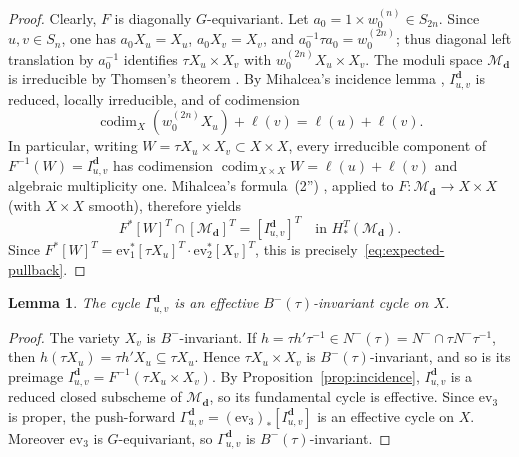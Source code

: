 \documentclass[12pt]{amsart}
\newtheorem{lemma}[theorem]{Lemma}
\theoremstyle{definition}
\theoremstyle{remark}
\begin{document}
\begin{proof}
Clearly, \(F\) is diagonally \(G\)-equivariant. Let
\(a_0=1\times w_0^{(n)}\in S_{2n}\). Since \(u,v\in S_n\), one has
\(a_0X_u=X_u\), \(a_0X_v=X_v\), and \(a_0^{-1}\tau a_0=w_0^{(2n)}\); thus
diagonal left translation by \(a_0^{-1}\) identifies
\(\tau X_u\times X_v\) with \(w_0^{(2n)}X_u\times X_v\). The moduli space \(\mathcal{M}_{\mathbf{d}}\)
is irreducible by Thomsen's theorem \cite[Theorem~1]{thomsen}. By 
Mihalcea's incidence lemma \cite[Lemma~6.3]{Mih}, 
\(I_{u,v}^{\mathbf{d}}\) is reduced, locally irreducible, and of
codimension
\[
\operatorname{codim}_X(w_0^{(2n)}X_u)+\ell(v)=\ell(u)+\ell(v).
\]
In particular, writing \(W=\tau X_u\times X_v\subset X\times X\), every irreducible
component of \(F^{-1}(W)=I_{u,v}^{\mathbf{d}}\) has codimension
\(\operatorname{codim}_{X\times X}W=\ell(u)+\ell(v)\) and algebraic multiplicity
one. Mihalcea's formula~(2'') \cite[Section~3.1]{Mih}, applied to
\(F:\mathcal{M}_{\mathbf{d}}\to X\times X\) (with \(X\times X\) smooth),
therefore yields
\[
F^*[W]^T\cap[\mathcal{M}_{\mathbf{d}}]^T
=[I_{u,v}^{\mathbf{d}}]^T
\quad\text{in }H_*^T(\mathcal{M}_{\mathbf{d}}).
\]
Since \(F^*[W]^T=\mathrm{ev}_1^*[\tau X_u]^T\cdot\mathrm{ev}_2^*[X_v]^T\),
this is precisely~\eqref{eq:expected-pullback}.
\end{proof}

\begin{lemma}
  \label{lem:gamma-properties}
  The cycle \(\Gamma_{u,v}^{\mathbf{d}}\) is an effective
  \(B^-(\tau)\)-invariant cycle on \(X\).
  \end{lemma}
  
  \begin{proof}
  The variety \(X_v\) is \(B^-\)-invariant. If
  \(h=\tau h'\tau^{-1}\in N^-(\tau)=N^-\cap\tau N^-\tau^{-1}\), then
  \(h(\tau X_u)=\tau h'X_u\subseteq\tau X_u\). Hence
  \(\tau X_u\times X_v\) is \(B^-(\tau)\)-invariant, and so is its
  preimage \(I_{u,v}^{\mathbf{d}}=F^{-1}(\tau X_u\times X_v)\). By Proposition~\ref{prop:incidence}, \(I_{u,v}^{\mathbf{d}}\) is a reduced
  closed subscheme of \(\mathcal{M}_{\mathbf{d}}\),
  so its fundamental cycle is effective. Since \(\mathrm{ev}_3\) is proper,
  the push-forward \(\Gamma_{u,v}^{\mathbf{d}}=(\mathrm{ev}_3)_*[I_{u,v}^{\mathbf{d}}]\)
  is an effective cycle on \(X\). Moreover \(\mathrm{ev}_3\) is
  \(G\)-equivariant, so \(\Gamma_{u,v}^{\mathbf{d}}\) is
  \(B^-(\tau)\)-invariant.
  \end{proof}
\end{document}
